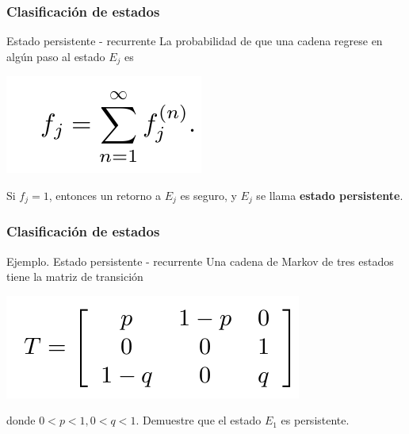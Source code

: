 \documentclass[spanish]{beamer}
\begin{document}
\begin{frame}
\frametitle{Clasificación de estados}

\begin{block}{Estado persistente - recurrente}
La probabilidad de que una cadena regrese en algún paso al estado $E_j$ es
\begin{center}
\includegraphics[scale=0.35]{im36}
\end{center}

Si $f_{j} = 1$, entonces un retorno a $E_{j}$ es seguro, y $E_{j}$ se llama \textbf{estado persistente}.
\end{block}


\end{frame}
\begin{frame}
\frametitle{Clasificación de estados}
Ejemplo. Estado persistente - recurrente
Una cadena de Markov de tres estados tiene la matriz de transición
\begin{center}
\includegraphics[scale=0.35]{im37}
\end{center}
donde $0 <p <1, 0 <q <1$. Demuestre que el estado $E_1$ es persistente.
\end{frame}
\end{document}
